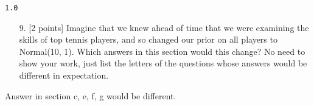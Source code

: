 \documentclass[12pt,a4paper]{article}
\begin{document}
\begin{lstlisting}
1.0
\end{lstlisting}


\begin{itemize}
\item[9.  ] [2 points] Imagine that we knew ahead of time that we were examining the skills of top tennis players, and so changed our prior on all players to Normal(10, 1). Which answers in this section would this change? No need to show your work, just list the letters of the questions whose answers would be different in expectation.

\end{itemize}
Answer in section c, e, f, g would be different.
\end{document}
